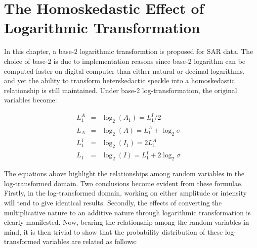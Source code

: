 
\section{The Homoskedastic Effect of Logarithmic Transformation}


In this chapter, a base-2 logarithmic transformtion is proposed for SAR data. 
The choice of base-2 is due to implementation reasons
  since base-2 logarithm can be computed faster on digital computer than either natural or decimal logarithms,
  and yet the ability to transform heterskedactic speckle into a homoskedastic relationship is still maintained.
Under base-2 log-transformation, the original variables become:

\begin{eqnarray}
L_{1}^{A} &=& \log_2(A_1) = L_{1}^{I} / 2 \\
L_A &=& \log_2(A) 	= L_{1}^{A} + \log_2\sigma \\
L_{1}^{I} &=& \log_2(I_1) = 2 L_{1}^{A} \\
L_I &=& \log_2(I) 	= L_{1}^{I} + 2 \log_2\sigma
\end{eqnarray}

The equations above highlight the relationships among random variables in the log-transformed domain. 
Two conclusions become evident from these formulae. 
Firstly, in the log-transformed domain, working on either amplitude or intensity will tend to give identical results. 
Secondly, the effects of converting the multiplicative nature to an additive nature through logarithmic transformation
is clearly manifested. 
Now, bearing the relationship among the random variables in mind, it is then trivial to 
show that the probability distribution of these log-transformed variables are related as follows:

